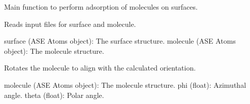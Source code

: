 \documentclass[letterpaper,10pt,english]{sphinxmanual}
\begin{document}

\begin{fulllineitems}
\label{\detokenize{module_documentation:Adsorption.main}}
\pysigstartsignatures
{}
\pysigstopsignatures
\sphinxAtStartPar
Main function to perform adsorption of molecules on surfaces.

\end{fulllineitems}


\begin{fulllineitems}
\label{\detokenize{module_documentation:Adsorption.read_input_files}}
\pysigstartsignatures
{}
\pysigstopsignatures
\sphinxAtStartPar
Reads input files for surface and molecule.
\begin{description}
\sphinxAtStartPar
surface (ASE Atoms object): The surface structure.
molecule (ASE Atoms object): The molecule structure.

\end{description}

\end{fulllineitems}


\begin{fulllineitems}
\label{\detokenize{module_documentation:Adsorption.rotate_molecule}}
\pysigstartsignatures
{}
\pysigstopsignatures
\sphinxAtStartPar
Rotates the molecule to align with the calculated orientation.
\begin{description}
\sphinxAtStartPar
molecule (ASE Atoms object): The molecule structure.
phi (float): Azimuthal angle.
theta (float): Polar angle.

\end{description}

\end{fulllineitems}
\end{document}

